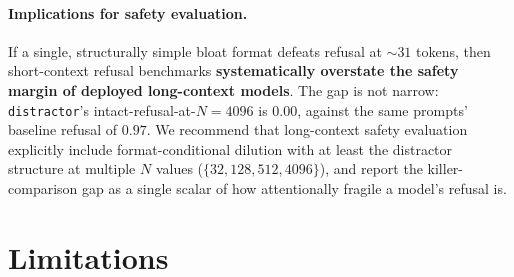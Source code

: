 \documentclass[10pt,twocolumn]{article}
\newcommand{\Ncontext}{N}
\theoremstyle{definition}
\begin{document}
\paragraph{Implications for safety evaluation.}
If a single, structurally simple bloat format defeats refusal at
${\sim}31$ tokens, then short-context refusal benchmarks
\textbf{systematically overstate the safety margin of deployed
long-context models}. The gap is not narrow: \texttt{distractor}'s
intact-refusal-at-$\Ncontext{=}4096$ is $0.00$, against the same
prompts' baseline refusal of $0.97$. We recommend that long-context
safety evaluation explicitly include format-conditional dilution
with at least the distractor structure at multiple $\Ncontext$ values
($\{32, 128, 512, 4096\}$), and report the killer-comparison gap as a
single scalar of how attentionally fragile a model's refusal is.

\section{Limitations}
\label{sec:limitations}
\end{document}
